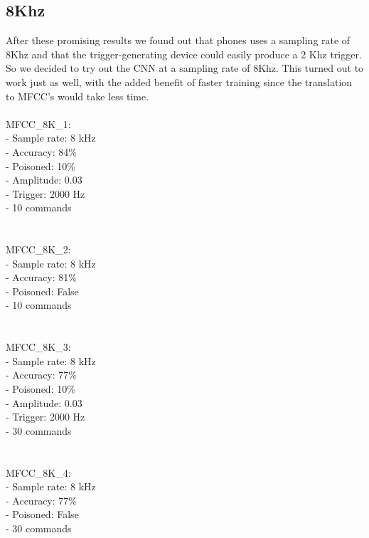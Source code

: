 \documentclass{article}
\theoremstyle{definition}
\theoremstyle{remark}
\begin{document}
\subsection{8Khz}
After these promising results we found out that phones uses a sampling rate of 8Khz and that the trigger-generating device could easily produce a 2 Khz trigger. So we decided to try out the CNN at a sampling rate of 8Khz. This turned out to work just as well, with the added benefit of faster training since the translation to MFCC's would take less time.\\\\
MFCC\_8K\_1:\\
- Sample rate: 8 kHz\\
- Accuracy: 84\%\\
- Poisoned: 10\%\\
- Amplitude: 0.03\\
- Trigger: 2000 Hz\\
- 10 commands\\
\\\\
MFCC\_8K\_2:\\
- Sample rate: 8 kHz\\
- Accuracy: 81\%\\
- Poisoned: False\\
- 10 commands\\
\\\\
MFCC\_8K\_3:\\
- Sample rate: 8 kHz\\
- Accuracy: 77\%\\
- Poisoned: 10\%\\
- Amplitude: 0.03\\
- Trigger: 2000 Hz\\
- 30 commands\\
\\\\
MFCC\_8K\_4:\\
- Sample rate: 8 kHz\\
- Accuracy: 77\%\\
- Poisoned: False\\
- 30 commands\\
\end{document}
